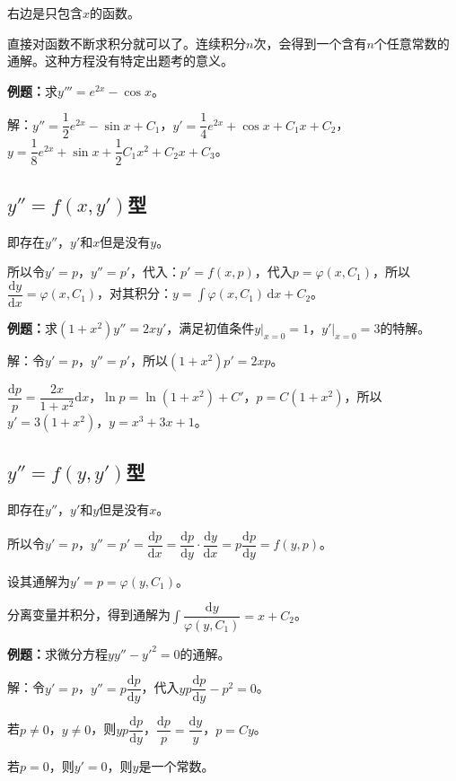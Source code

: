 \documentclass[UTF8, 12pt]{ctexart}
\begin{document}
右边是只包含$x$的函数。

直接对函数不断求积分就可以了。连续积分$n$次，会得到一个含有$n$个任意常数的通解。这种方程没有特定出题考的意义。

\textbf{例题：}求$y'''=e^{2x}-\cos x$。

解：$y''=\dfrac{1}{2}e^{2x}-\sin x+C_1$，$y'=\dfrac{1}{4}e^{2x}+\cos x+C_1x+C_2$，$y=\dfrac{1}{8}e^{2x}+\sin x+\dfrac{1}{2}C_1x^2+C_2x+C_3$。

\subsection{\texorpdfstring{$y''=f(x,y')$}\ 型}

即存在$y''$，$y'$和$x$但是没有$y$。

所以令$y'=p$，$y''=p'$，代入：$p'=f(x,p)$，代入$p=\varphi(x,C_1)$，所以$\dfrac{\textrm{d}y}{\textrm{d}x}=\varphi(x,C_1)$，对其积分：$y=\int\varphi(x,C_1)\,\textrm{d}x+C_2$。

\textbf{例题：}求$(1+x^2)y''=2xy'$，满足初值条件$y\vert_{x=0}=1$，$y'\vert_{x=0}=3$的特解。

解：令$y'=p$，$y''=p'$，所以$(1+x^2)p'=2xp$。

$\dfrac{\textrm{d}p}{p}=\dfrac{2x}{1+x^2}\textrm{d}x$，$\ln p=\ln(1+x^2)+C'$，$p=C(1+x^2)$，所以$y'=3(1+x^2)$，$y=x^3+3x+1$。

\subsection{\texorpdfstring{$y''=f(y,y')$}\ 型}

即存在$y''$，$y'$和$y$但是没有$x$。

所以令$y'=p$，$y''=p'=\dfrac{\textrm{d}p}{\textrm{d}x}=\dfrac{\textrm{d}p}{\textrm{d}y}\cdot\dfrac{\textrm{d}y}{\textrm{d}x}=p\dfrac{\textrm{d}p}{\textrm{d}y}=f(y,p)$。

设其通解为$y'=p=\varphi(y,C_1)$。

分离变量并积分，得到通解为$\displaystyle{\int\dfrac{\textrm{d}y}{\varphi(y,C_1)}=x+C_2}$。

\textbf{例题：}求微分方程$yy''-y'^2=0$的通解。

解：令$y'=p$，$y''=p\dfrac{\textrm{d}p}{\textrm{d}y}$，代入$yp\dfrac{\textrm{d}p}{\textrm{d}y}-p^2=0$。

若$p\neq0$，$y\neq0$，则$yp\dfrac{\textrm{d}p}{\textrm{d}y}$，$\dfrac{\textrm{d}p}{p}=\dfrac{\textrm{d}y}{y}$，$p=Cy$。

若$p=0$，则$y'=0$，则$y$是一个常数。
\end{document}
